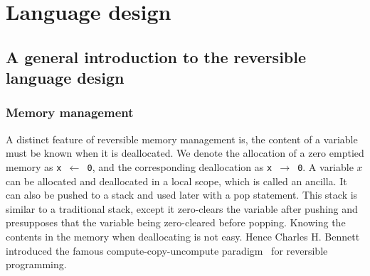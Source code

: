 \documentclass{article}
\newcommand{\<}{\langle}
\renewcommand{\>}{\rangle}
\theoremstyle{definition}\newtheorem{definition}{\textit{Definition}}
\begin{document}
\section{Language design}\label{sec:lang}

\subsection{A general introduction to the reversible language design}

\subsubsection{Memory management}
    A distinct feature of reversible memory management is, the content of a variable must be known when it is deallocated.
    We denote the allocation of a zero emptied memory as \texttt{x $\leftarrow$ 0}, and the corresponding deallocation as \texttt{x $\rightarrow$ 0}.
    A variable $x$ can be allocated and deallocated in a local scope, which is called an ancilla.
    It can also be pushed to a stack and used later with a pop statement.
    This stack is similar to a traditional stack, except it zero-clears the variable after pushing and presupposes that the variable being zero-cleared before popping.
Knowing the contents in the memory when deallocating is not easy. Hence Charles H. Bennett introduced the famous compute-copy-uncompute paradigm~\cite{Bennett1973} for reversible programming.
\end{document}
